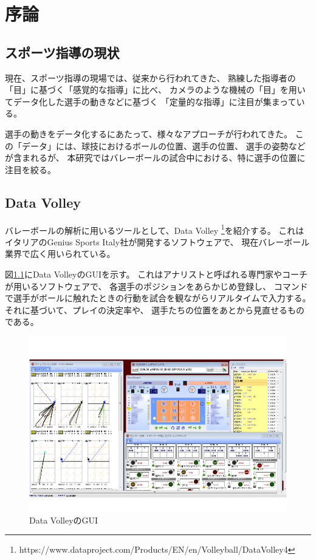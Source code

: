 \documentclass[a4j, fleqn, 12pt]{jsreport}
\begin{document}
\maketitle
\tableofcontents
\cleardoublepage
{}

\chapter{序論} \label{cha:background}
    \section{スポーツ指導の現状} \label{sec:current}
        現在、スポーツ指導の現場では、従来から行われてきた、
        熟練した指導者の「目」に基づく「感覚的な指導」に比べ、
        カメラのような機械の「目」を用いてデータ化した選手の動きなどに基づく
        「定量的な指導」に注目が集まっている\cite{JSA}。

        選手の動きをデータ化するにあたって、様々なアプローチが行われてきた\cite{Watanabe}。
        この「データ」には、球技におけるボールの位置、選手の位置、
        選手の姿勢などが含まれるが、
        本研究ではバレーボールの試合中における、特に選手の位置に注目を絞る。

    \section{Data Volley} \label{sec:Data Volley}
        バレーボールの解析に用いるツールとして、Data Volley
        \footnote{https://www.dataproject.com/Products/EN/en/Volleyball/DataVolley4}を紹介する。
        これはイタリアのGenius Sports Italy社が開発するソフトウェアで、
        現在バレーボール業界で広く用いられている。

        図\ref{fig:Data Volley}にData VolleyのGUIを示す。
        これはアナリストと呼ばれる専門家やコーチが用いるソフトウェアで、
        各選手のポジションをあらかじめ登録し、
        コマンドで選手がボールに触れたときの行動を試合を観ながらリアルタイムで入力する。
        それに基づいて、プレイの決定率や、
        選手たちの位置をあとから見直せるものである。

        \begin{figure}[ht]
            \centering
            \includegraphics[width=0.8\hsize]{images/data-volley.png}
            \caption{Data VolleyのGUI}
            \label{fig:Data Volley}
        \end{figure}
        
\end{document}
